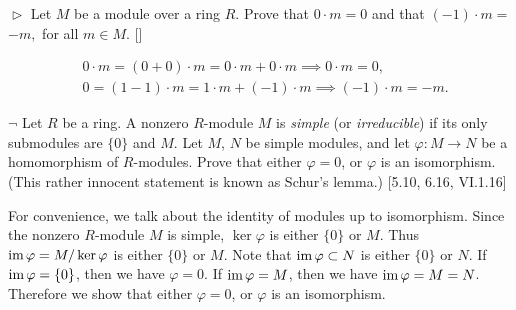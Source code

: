 \documentclass[12pt,letterpaper,boxed]{hmcpset}
\newcommand{\im}{\mathrm{im}\hspace{1.5pt}}
\begin{document}
\begin{problem}[5.3]
$\vartriangleright$ Let $M$ be a module over a ring $R .$ Prove that $0 \cdot m=0$ and that $(-1) \cdot m=$ $-m,$ for all $m \in M$. []
\end{problem}
\begin{solution}
	\begin{align*}
	&0\cdot m=(0+0)\cdot m=0\cdot m+0\cdot m\implies0\cdot m=0,\\
	&0=(1-1)\cdot m=1\cdot m+(-1) \cdot m\implies(-1) \cdot m=-m.
	\end{align*}
\end{solution}

\hypertarget{Exercise III.5.4}{}
\begin{problem}[5.4]
$\neg$ Let $R$ be a ring. A nonzero $R$-module $M$ is \emph{simple} (or \emph{irreducible}) if its only submodules are $\{0\}$ and $M$. Let $M$, $N$ be simple modules, and let $\varphi : M \to N$ be a homomorphism of $R$-modules. Prove that either $\varphi= 0$, or $\varphi$ is an isomorphism. (This rather innocent statement is known as Schur's lemma.) [5.10, 6.16, VI.1.16]
\end{problem}
\begin{solution}
For convenience, we talk about the identity of modules up to isomorphism. Since the nonzero $R$-module $M$ is simple, $\ker\varphi $ is either $\{0\}$ or $M$. Thus $\im \varphi= M/ \ker\varphi$ is either $\{0\}$ or $M$. Note that $\im \varphi\subset N$ is either $\{0\}$ or $N$. If $\im \varphi=\{0\}$, then we have $\varphi=0$. If $\im \varphi=M$, then we have $\im \varphi=M=N$. Therefore we show that either $\varphi= 0$, or $\varphi$ is an isomorphism. 
\end{solution}
\end{document}
